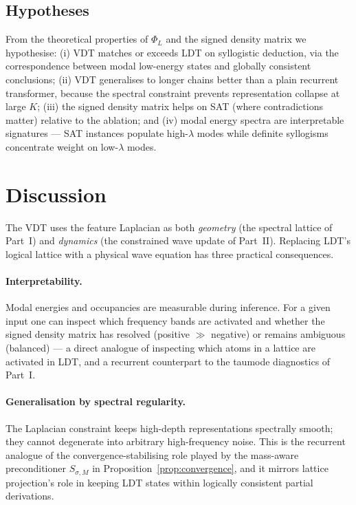 \documentclass[12pt,a4paper]{article}
\theoremstyle{plain}
\theoremstyle{definition}
\theoremstyle{remark}
\newcommand{\1}{\mathbf{1}}
\newcommand{\VDT}{\textsc{VDT}}
\begin{document}
\subsection{Hypotheses}

From the theoretical properties of $\Phi_L$ and the signed density
matrix we hypothesise: (i) \VDT{} matches or exceeds \textsc{LDT} on
syllogistic deduction, via the correspondence between modal low-energy
states and globally consistent conclusions; (ii) \VDT{} generalises to
longer chains better than a plain recurrent transformer, because the
spectral constraint prevents representation collapse at large $K$;
(iii) the signed density matrix helps on SAT (where contradictions
matter) relative to the ablation; and (iv) modal energy spectra are
interpretable signatures --- SAT instances populate high-$\lambda$ modes
while definite syllogisms concentrate weight on low-$\lambda$ modes.

\section{Discussion}
\label{sec:discussion}

The \VDT{} uses the feature Laplacian as both \emph{geometry} (the
spectral lattice of Part~I) and \emph{dynamics} (the constrained wave
update of Part~II). Replacing \textsc{LDT}'s logical lattice with a
physical wave equation has three practical consequences.

\paragraph{Interpretability.}
Modal energies and occupancies are measurable during inference. For a
given input one can inspect which frequency bands are activated and
whether the signed density matrix has resolved (positive $\gg$ negative)
or remains ambiguous (balanced) --- a direct analogue of inspecting which
atoms in a lattice are activated in \textsc{LDT}, and a recurrent
counterpart to the taumode diagnostics of Part~I.

\paragraph{Generalisation by spectral regularity.}
The Laplacian constraint keeps high-depth representations spectrally
smooth; they cannot degenerate into arbitrary high-frequency noise. This
is the recurrent analogue of the convergence-stabilising role played by
the mass-aware preconditioner $S_{\sigma,M}$ in
Proposition~\ref{prop:convergence}, and it mirrors lattice projection's
role in keeping \textsc{LDT} states within logically consistent partial
derivations.
\end{document}
